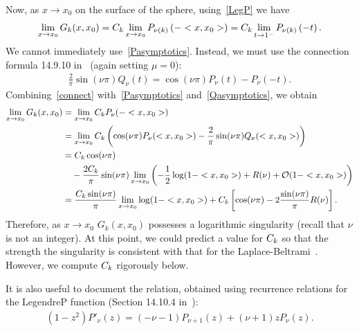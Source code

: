 Now, as $x\rightarrow x_{0}$ on the surface of the sphere,
using~\eqref{LegP} we have 
\begin{align*}
  \lim_{x\rightarrow x_{0}}G_k(x,x_{0}) =
  C_k\lim_{x\rightarrow x_{0}} P_{\nu(k)}\left(-<x,x_{0}>\right) =
  C_k\lim_{t\rightarrow 1^-}P_{\nu(k)}\left(-t\right).
\end{align*}
We cannot immediately use~\eqref{Pasymptotics}. Instead, we must use the
connection formula 14.9.10 in~\cite{fatAbramowitz} (again setting
$\mu=0$):
\begin{align}
  \frac{2}{\pi}\sin(\nu \pi)Q_\nu(t)= \cos(\nu\pi)P_\nu(t) - P_\nu(-t).
  \label{connect}
\end{align}
Combining~\eqref{connect} with~\eqref{Pasymptotics}
and~\eqref{Qasymptotics}, we obtain
\begin{align}
  \lim_{x\rightarrow x_{0}}G_k(x,x_{0}) &= \lim_{x\rightarrow x_{0}}
      C_k P_{\nu}(-<x,x_{0}>) \nonumber \\
  &= \lim_{x\rightarrow x_{0} }C_k\left(\cos(\nu\pi)
  P_{\nu}(<x,x_{0}>) - 
      \frac{2}{\pi}\sin(\nu \pi)Q_{\nu}(<x,x_0>)\right) \nonumber \\
  &= C_k\cos(\nu\pi) \nonumber \\
  & \quad - \frac{2C_k}{\pi}\sin(\nu\pi)\lim_{x\rightarrow x_0} 
      \left(-\frac{1}{2}\log(1-<x,x_0>) + R(\nu) +
      \mathcal{O}(1-<x,x_0>)\right) \nonumber \\
  &=\frac{C_k\sin(\nu\pi)}{\pi}\lim_{x\rightarrow x_0}
      \log(1-<x,x_0>) + C_k\left[\cos(\nu\pi)-
      2\frac{\sin(\nu\pi)}{\pi}R(\nu)\right].
  \label{e:logSingularity}
\end{align}
Therefore, as $x\rightarrow x_{0}$ $G_k(x,x_{0})$ possesses a
logarithmic singularity (recall that $\nu$ is not an integer).  At this
point, we could predict a value for $C_k$ so that the strength the
singularity is consistent with that for the
Laplace-Beltrami~\cite{gemmrich}.  However, we compute $C_k$ rigorously
below.

It is also useful to document the relation, obtained using recurrence
relations for the LegendreP function (Section 14.10.4
in~\cite{fatAbramowitz}):
\begin{align*} 
  (1-z^2) P'_\nu(z) = (-\nu-1) P_{\nu+1}(z) + (\nu+1)z P_\nu(z).
\end{align*}


